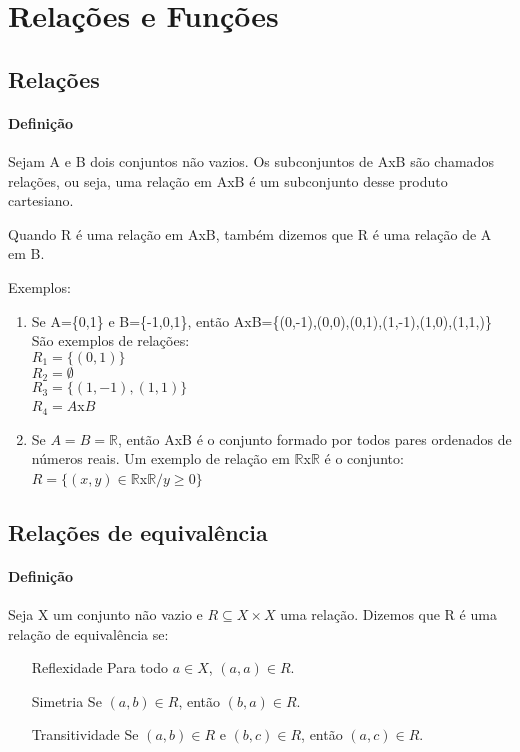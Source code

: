 \chapter{Rela{\c c}{\~o}es e Fun{\c c}{\~o}es}
\section{Rela{\c c}{\~o}es}
\subsubsection{Defini{\c c}{\~a}o}
Sejam A e B dois conjuntos n{\~a}o vazios. Os subconjuntos de AxB s{\~a}o chamados rela{\c c}{\~o}es, ou seja, uma rela{\c c}{\~a}o em AxB {\'e} um subconjunto desse produto cartesiano.

Quando R {\'e} uma rela{\c c}{\~a}o em AxB, tamb{\'e}m dizemos que R {\'e} uma rela{\c c}{\~a}o de A em B.

Exemplos:
\begin{enumerate}
\item Se A=\{0,1\} e B=\{-1,0,1\}, ent{\~a}o AxB=\{(0,-1),(0,0),(0,1),(1,-1),(1,0),(1,1,)\}\\
S{\~a}o exemplos de rela{\c c}{\~o}es:\\
$R_{1}=\{(0,1)\}$\\
$R_{2}=\emptyset$\\
$R_{3}=\{(1,-1),(1,1)\}$\\
$R_{4}=A$x$B$
\item Se $A=B=\mathbb{R}$, ent{\~a}o AxB {\'e} o conjunto formado por todos pares ordenados de n{\'u}meros reais. Um exemplo de rela{\c c}{\~a}o em $\mathbb{R}$x$\mathbb{R}$ {\'e} o conjunto:\\
$R=\{(x,y)\in \mathbb{R}$x$\mathbb{R}/ y\geq 0\}$
\end{enumerate}

\section{Rela{\c c}{\~o}es de equival{\^e}ncia}
\subsubsection{Defini{\c c}{\~a}o}
\begin{definicao} Seja X um conjunto n{\~a}o vazio e $R\subseteq X \times X$ uma rela{\c c}{\~a}o. Dizemos que R {\'e} uma rela{\c c}{\~a}o de equival{\^e}ncia se:
\begin{enumerate}
\item[Reflexidade] Para todo $a \in X$, $(a,a)\in R$.
\item[Simetria] Se $(a, b) \in R$, então $(b, a) \in R$.
\item[Transitividade] Se $(a, b) \in R$ e $(b, c) \in R$, então $(a, c)\in R$.
\end{enumerate}
\end{definicao}

